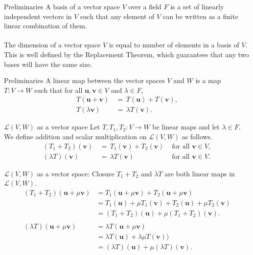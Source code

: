 \documentclass{beamer}
\def\u{\bm{u}}
\def\v{\bm{v}}
\def\L{\mathcal{L}}
\begin{document}
        \begin{frame}{Preliminaries}
                A basis of a vector space $V$ over a field $F$ is a set of linearly independent vectors in $V$ such that any element of $V$
                can be written as a finite linear combination of them. \\~\\

                The dimension of a vector space $V$ is equal to number of elements in a basis of $V$. This is well defined by the 
                Replacement Theorem, which guarantees that any two bases will have the same size.
        \end{frame}

        \begin{frame}{Preliminaries}
                A linear map between the vector spaces $V$ and $W$ is a map $T\colon V \to W$ such that for all $\u, \v \in V$ and $\lambda \in F$,
                \begin{align*}
                        T(\u + \v) \,&=\, T(\u) + T(\v), \\
                        T(\lambda \v) \,&=\, \lambda T(\v).
                \end{align*}
        \end{frame}

        \begin{frame}{$\L(V, W)$ as a vector space}
                Let $T, T_1, T_2\colon V \to W$ be linear maps and let $\lambda \in F$. We define addition and scalar multiplication 
                on $\L(V, W)$ as follows.
                \begin{align*}
                        (T_1 + T_2)(\v) \,&=\, T_1(\v) + T_2(\v) &\text{ for all } \v \in V, \\
                        (\lambda T)(\v) \,&=\, \lambda T(\v) &\text{ for all } \v \in V.
                \end{align*}
        \end{frame}

        \begin{frame}{$\L(V, W)$ as a vector space: Closure}
                $T_1 + T_2$ and $\lambda T$ are both linear maps in $\L(V, W)$.
                \begin{align*}
                        (T_1 + T_2)(\u + \mu\v) &= T_1(\u + \mu\v) + T_2(\u + \mu\v) \\
                                &= T_1(\u) + \mu T_1(\v) + T_2(\u) + \mu T_2(\v) \\
                                &= (T_1 + T_2)(\u) + \mu (T_1 + T_2)(\v). \\\\
                        (\lambda T)(\u + \mu \v) &= \lambda T(\u + \mu \v) \\
                                &= \lambda T(\u) + \lambda\mu T(\v)) \\
                                &= (\lambda T)(\u) + \mu (\lambda T)(\v).
                \end{align*}
        \end{frame}
\end{document}
